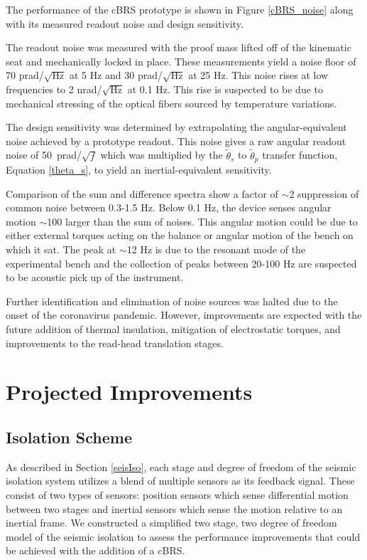 \documentclass [12pt, proquest]{uwthesis}[2019]
\begin{document}
The performance of the cBRS prototype is shown in Figure \ref{cBRS_noise} along with its measured readout noise and design sensitivity. 

The readout noise was measured with the proof mass lifted off of the kinematic seat and mechanically locked in place. These measurements yield a noise floor of 70 prad/$\sqrt{\text{Hz}}$ at 5 Hz and 30 prad/$\sqrt{\text{Hz}}$ at 25 Hz. This noise rises at low frequencies to 2 nrad/$\sqrt{\text{Hz}}$ at 0.1 Hz. This rise is suspected to be due to mechanical stressing of the optical fibers sourced by temperature variations.

 The design sensitivity was determined by extrapolating the angular-equivalent noise achieved by a prototype readout. This noise gives a raw angular readout noise of 50~prad/$\sqrt{f}$ which was multiplied by the $\tilde{\theta}_{s}$ to $\tilde{\theta}_{p}$ transfer function, Equation \ref{theta_s}, to yield an inertial-equivalent sensitivity.
 
 Comparison of the sum and difference spectra show a factor of $\sim$2 suppression of common noise between 0.3-1.5 Hz. Below 0.1 Hz, the device senses angular motion $\sim$100 larger than the sum of noises. This angular motion could be due to either external torques acting on the balance or angular motion of the bench on which it sat. The peak at $\sim$12 Hz is due to the resonant mode of the experimental bench and the collection of peaks between 20-100 Hz are suspected to be acoustic pick up of the instrument. 
 
 Further identification and elimination of noise sources was halted due to the onset of the coronavirus pandemic. However, improvements are expected with the future addition of thermal insulation, mitigation of electrostatic torques, and improvements to the read-head translation stages.


\section{Projected Improvements}
\subsection{Isolation Scheme} \label{IsoScheme}

As described in Section \ref{seisIso}, each stage and degree of freedom of the seismic isolation system utilizes a blend of multiple sensors as its feedback signal. These consist of two types of sensors: position sensors which sense differential motion between two stages and inertial sensors which sense the motion relative to an inertial frame. We constructed a simplified two stage, two degree of freedom model of the seismic isolation to assess the performance improvements that could be achieved with the addition of a cBRS. 
\end{document}
